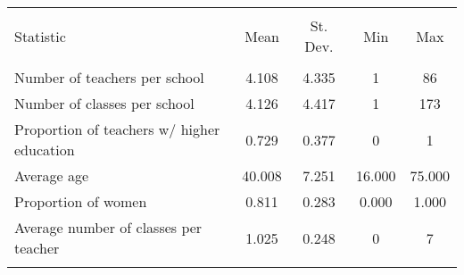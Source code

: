 
\begin{tabular}{@{\extracolsep{5pt}}lcccc} 
\\[-1.8ex]\hline 
\hline \\[-1.8ex] 
Statistic & \multicolumn{1}{c}{Mean} & \multicolumn{1}{c}{St. Dev.} & \multicolumn{1}{c}{Min} & \multicolumn{1}{c}{Max} \\ 
\hline \\[-1.8ex] 
Number of teachers per school & 4.108 & 4.335 & 1 & 86 \\ 
Number of classes per school & 4.126 & 4.417 & 1 & 173 \\ 
Proportion of teachers w/ higher education & 0.729 & 0.377 & 0 & 1 \\ 
Average age & 40.008 & 7.251 & 16.000 & 75.000 \\ 
Proportion of women & 0.811 & 0.283 & 0.000 & 1.000 \\ 
Average number of classes per teacher & 1.025 & 0.248 & 0 & 7 \\ 
\hline \\[-1.8ex] 
\end{tabular} 

